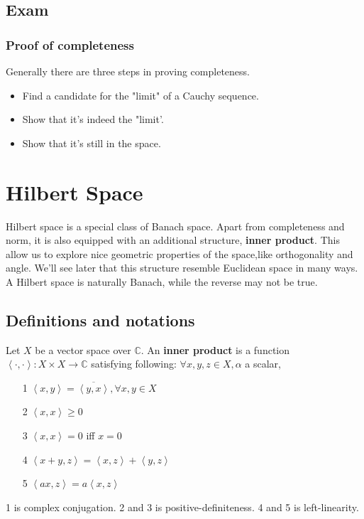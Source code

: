 \subsection{Exam}
\subsubsection{Proof of completeness}
Generally there are three steps in proving completeness.
\begin{itemize}
	\item Find a candidate for the "limit" of a Cauchy sequence.
	\item Show that it's indeed the "limit'.
	\item Show that it's still in the space.
\end{itemize}

\newpage
\section{Hilbert Space}
Hilbert space is a special class of Banach space. Apart from completeness and norm, it is also equipped with an additional structure, {\bf inner product}. This allow us to explore nice geometric properties of the space,like orthogonality and angle. We'll see later that this structure resemble Euclidean space in many ways. A Hilbert space is naturally Banach, while the reverse may not be true.
\subsection{Definitions and notations}
\begin{definition}\rm\label{Inner product}\nextline
	Let $X$ be a vector space over $\mathbb C$. An {\bf inner product} is a function $\left<\cdot,\cdot\right>:X\times X\xrightarrow{}{\mathbb C}$ satisfying following: $\forall x,y,z\in X,\alpha$ a scalar,
	\begin{itemize}
		\item[1] $\left<x,y\right>={\overline{\left<y,x\right>}},\forall x,y\in X$
		\item[2] $\left<x,x\right>\geq0$
		\item[3] $\left<x,x\right>=0$ iff $x=0$
		\item[4] $\left<x+y,z\right>=\left<x,z\right>+\left<y,z\right>$
		\item[5] $\left<ax,z\right>=a\left<x,z\right>$
	\end{itemize}
\end{definition}
1 is complex conjugation. 2 and 3 is positive-definiteness. 4 and 5 is left-linearity.

